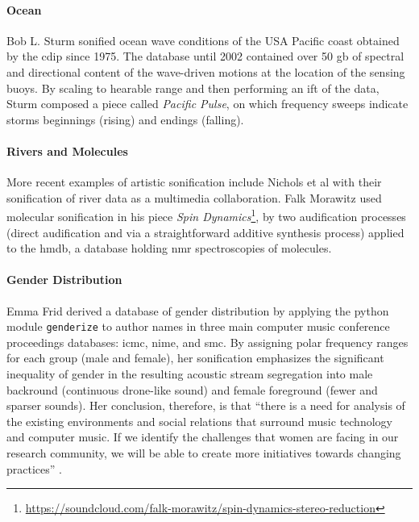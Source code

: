 \paragraph{Ocean}
Bob L. Sturm \parencite{icmc/bbp2372.2002.056} sonified ocean wave conditions of the USA Pacific coast obtained by the \gls{cdip} since 1975. The database until 2002 contained over 50 \gls{gb} of spectral and directional content of the wave-driven motions at the location of the sensing buoys. By scaling to hearable range and then performing an \gls{ift} of the data, Sturm composed a piece called \textit{Pacific Pulse}, on which frequency sweeps indicate storms beginnings (rising) and endings (falling).

\paragraph{Rivers and Molecules}
More recent examples of artistic sonification include Nichols et al \parencite{icmc/bbp2372.2014.065} with their sonification of river data as a multimedia collaboration. Falk Morawitz \parencite{icmc/bbp2372.2016.002} used molecular sonification in his piece \textit{Spin Dynamics}\footnote{\url{https://soundcloud.com/falk-morawitz/spin-dynamics-stereo-reduction}}, by two audification processes (direct audification and via a straightforward additive synthesis process) applied to the \gls{hmdb}, a database holding \gls{nmr} spectroscopies of molecules.


\paragraph{Gender Distribution}
Emma Frid \parencite{Fri17:Son} derived a database of gender distribution by applying the python module \texttt{genderize} to author names in three main computer music conference proceedings databases: \gls{icmc}, \gls{nime}, and \gls{smc}. By assigning polar frequency ranges for each group (male and female), her sonification emphasizes the significant inequality of gender in the resulting acoustic stream segregation into male backround (continuous drone-like sound) and female foreground (fewer and sparser sounds). Her conclusion, therefore, is that ``there is a need for analysis of the existing environments and social relations that surround music technology and computer music. If we identify the challenges that women are facing in our research community, we will be able to create more initiatives towards changing practices'' \parencite[238]{Fri17:Son}.

